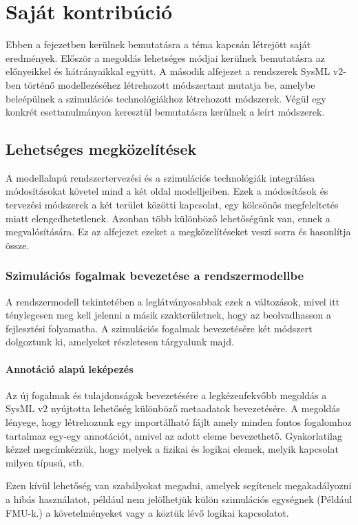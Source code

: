 \chapter{Saját kontribúció}
Ebben a fejezetben kerülnek bemutatásra a téma kapcsán létrejött saját eredmények. Először a megoldás lehetséges módjai kerülnek bemutatásra az előnyeikkel és hátrányaikkal együtt.
A második alfejezet a rendszerek SysML v2-ben történő modellezéséhez létrehozott módszertant mutatja be, amelybe beleépülnek a szimulációs technológiákhoz létrehozott módszerek.
Végül egy konkrét esettanulmányon keresztül bemutatásra kerülnek a leírt módszerek.

\section{Lehetséges megközelítések}
A modellalapú rendszertervezési és a szimulációs technológiák integrálása módosításokat követel mind a két oldal modelljeiben.
Ezek a módosítások és tervezési módszerek a két terület közötti kapcsolat, egy kölcsönös megfeleltetés miatt elengedhetetlenek.
Azonban több különböző lehetőségünk van, ennek a megvalósítására.
Ez az alfejezet ezeket a megközelítéseket veszi sorra és hasonlítja össze.

    \subsection{Szimulációs fogalmak bevezetése a rendszermodellbe}
    A rendszermodell tekintetében a leglátványosabbak ezek a változások, mivel itt ténylegesen meg kell jelenni a másik szakterületnek, hogy az beolvadhasson a fejlesztési folyamatba.
    A szimulációs fogalmak bevezetésére két módszert dolgoztunk ki, amelyeket részletesen tárgyalunk majd.

        \subsubsection{Annotáció alapú leképezés}
        Az új fogalmak és tulajdonságok bevezetésére a legkézenfekvőbb megoldás a SysML v2 nyújtotta lehetőség különböző metaadatok bevezetésére.
        A megoldás lényege, hogy létrehozunk egy importálható fájlt amely minden fontos fogalomhoz tartalmaz egy-egy annotációt, amivel az adott eleme bevezethető. Gyakorlatilag kézzel megcímkézzük, hogy melyek a fizikai és logikai elemek, melyik kapcsolat milyen típusú, stb.
        
        Ezen kívül lehetőség van szabályokat megadni, amelyek segítenek megakadályozni a hibás használatot, például nem jelölhetjük külön szimulációs egységnek (Például FMU-k.) a követelményeket vagy a köztük lévő logikai kapcsolatot.
        
